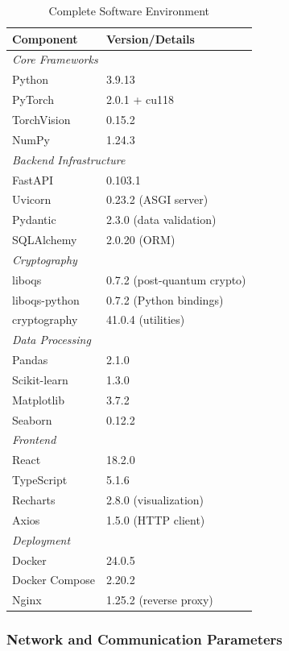 \documentclass[12pt,a4paper]{article}
\begin{document}
\begin{table}[H]
\centering
\caption{Complete Software Environment}
\begin{tabular}{ll}
\toprule
\textbf{Component} & \textbf{Version/Details} \\
\midrule
\multicolumn{2}{l}{\textit{Core Frameworks}} \\
Python & 3.9.13 \\
PyTorch & 2.0.1 + cu118 \\
TorchVision & 0.15.2 \\
NumPy & 1.24.3 \\
\midrule
\multicolumn{2}{l}{\textit{Backend Infrastructure}} \\
FastAPI & 0.103.1 \\
Uvicorn & 0.23.2 (ASGI server) \\
Pydantic & 2.3.0 (data validation) \\
SQLAlchemy & 2.0.20 (ORM) \\
\midrule
\multicolumn{2}{l}{\textit{Cryptography}} \\
liboqs & 0.7.2 (post-quantum crypto) \\
liboqs-python & 0.7.2 (Python bindings) \\
cryptography & 41.0.4 (utilities) \\
\midrule
\multicolumn{2}{l}{\textit{Data Processing}} \\
Pandas & 2.1.0 \\
Scikit-learn & 1.3.0 \\
Matplotlib & 3.7.2 \\
Seaborn & 0.12.2 \\
\midrule
\multicolumn{2}{l}{\textit{Frontend}} \\
React & 18.2.0 \\
TypeScript & 5.1.6 \\
Recharts & 2.8.0 (visualization) \\
Axios & 1.5.0 (HTTP client) \\
\midrule
\multicolumn{2}{l}{\textit{Deployment}} \\
Docker & 24.0.5 \\
Docker Compose & 2.20.2 \\
Nginx & 1.25.2 (reverse proxy) \\
\bottomrule
\end{tabular}
\end{table}

\subsubsection{Network and Communication Parameters}
\end{document}
